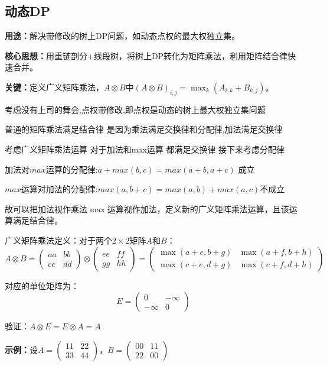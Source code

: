 \documentclass[a4paper, fontset=none]{ctexart}
\begin{document}
\subsection{动态DP}
\textbf{用途：}解决带修改的树上DP问题，如动态点权的最大权独立集。

\textbf{核心思想：}用重链剖分+线段树，将树上DP转化为矩阵乘法，利用矩阵结合律快速合并。

\textbf{关键：}定义广义矩阵乘法，$A \otimes B$中$(A \otimes B)_{i, j} = \max_k(A_{i, k} + B_{k, j})$。

考虑没有上司的舞会,点权带修改,即点权是动态的树上最大权独立集问题

普通的矩阵乘法满足结合律 是因为乘法满足交换律和分配律,加法满足交换律

考虑广义矩阵乘法运算 对于加法和max运算 都满足交换律 接下来考虑分配律

加法对$max$运算的分配律:$a+max(b, c)=max(a+b, a+c)$ 成立

$max$运算对加法的分配律:$max(a, b+c)=max(a, b)+max(a, c)$不成立

故可以把加法视作乘法$\max$运算视作加法，定义新的广义矩阵乘法运算，且该运算满足结合律。

广义矩阵乘法定义：对于两个$2 \times 2$矩阵$A$和$B$：
$$A \otimes B = \begin{pmatrix}a a&b b\\c c&d d\end{pmatrix} \otimes \begin{pmatrix}e e&f f\\g g&h h\end{pmatrix} = \begin{pmatrix}\max(a+e, b+g) & \max(a+f, b+h) \\ \max(c+e, d+g) & \max(c+f, d+h)\end{pmatrix}$$

对应的单位矩阵为：
$$E = \begin{pmatrix}0 & -\infty \\ -\infty & 0\end{pmatrix}$$

验证：$A \otimes E = E \otimes A = A$

\textbf{示例：}设$A = \begin{pmatrix}1 1&2 2\\3 3&4 4\end{pmatrix}$，$B = \begin{pmatrix}0 0&1 1\\2 2&0 0\end{pmatrix}$
\end{document}
